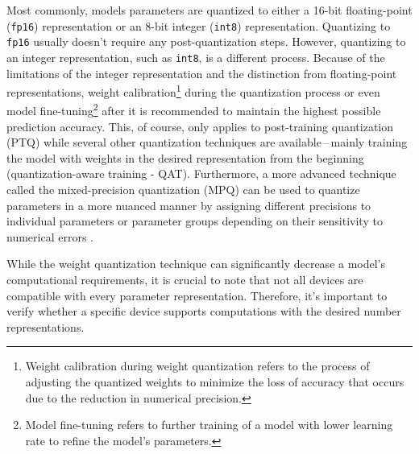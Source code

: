 Most commonly, models parameters are quantized to either a 16-bit floating-point
(\texttt{fp16}) representation or an 8-bit integer (\texttt{int8})
representation. Quantizing to \texttt{fp16} usually doesn't require any
post-quantization steps. However, quantizing to an integer representation, such
as \texttt{int8}, is a different process. Because of the limitations of the
integer representation and the distinction from floating-point representations,
weight calibration\footnote{Weight calibration during weight quantization refers
to the process of adjusting the quantized weights to minimize the loss of
accuracy that occurs due to the reduction in numerical precision.} during the
quantization process or even model fine-tuning\footnote{Model fine-tuning refers
to further training of a model with lower learning rate to refine the model's
parameters.} after it is recommended to maintain the highest possible prediction
accuracy. This, of course, only applies to post-training quantization (PTQ) while
several other quantization techniques are available\,--\,mainly training the
model with weights in the desired representation from the beginning (quantization-aware training - QAT).
Furthermore, a more advanced technique called the mixed-precision quantization
(MPQ) can be used to quantize parameters in a more nuanced manner by assigning
different precisions to individual parameters or parameter groups depending on
their sensitivity to numerical errors \cite{Tang2022}.

While the weight quantization technique can significantly decrease a model's
computational requirements, it is crucial to note that not all devices are
compatible with every parameter representation. Therefore, it's important to
verify whether a specific device supports computations with the desired number
representations.



